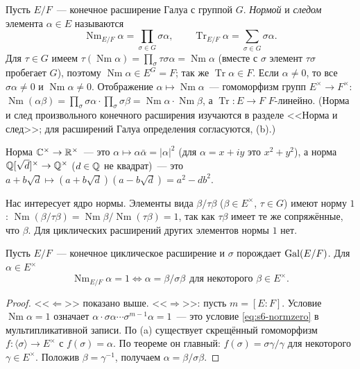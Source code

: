 Пусть $E/F$~--- конечное расширение Галуа с группой $G$. \emph{Нормой} и \emph{следом} элемента $\alpha\in E$ называются
\[
\operatorname{Nm}_{E/F}\alpha=\prod_{\sigma\in G}\sigma\alpha,\qquad \operatorname{Tr}_{E/F}\alpha=\sum_{\sigma\in G}\sigma\alpha.
\]
Для $\tau\in G$ имеем $\tau(\operatorname{Nm}\alpha)=\prod_\sigma\tau\sigma\alpha=\operatorname{Nm}\alpha$ (вместе с $\sigma$ элемент
$\tau\sigma$ пробегает $G$), поэтому $\operatorname{Nm}\alpha\in E^G=F$; так же $\operatorname{Tr}\alpha\in F$. Если $\alpha\ne0$, то все
$\sigma\alpha\ne0$ и $\operatorname{Nm}\alpha\ne0$. Отображение $\alpha\mapsto\operatorname{Nm}\alpha$~--- гомоморфизм групп $E^\times\to F^\times$:
$\operatorname{Nm}(\alpha\beta)=\prod_\sigma\sigma\alpha\cdot\prod_\sigma\sigma\beta=\operatorname{Nm}\alpha\cdot\operatorname{Nm}\beta$, а $\operatorname{Tr}\colon E\to F$
$F$-линейно. (Норма и след произвольного конечного расширения изучаются в разделе <<Норма и след>>; для расширений
Галуа определения согласуются, (b).)

\begin{example}[5.24]
Норма $\mathbb C^\times\to\mathbb R^\times$~--- это $\alpha\mapsto\alpha\bar\alpha=|\alpha|^2$ (для $\alpha=x+iy$ это $x^2+y^2$), а
норма $\mathbb Q[\sqrt d]^\times\to\mathbb Q^\times$ ($d\in\mathbb Q$ не квадрат)~--- это
$a+b\sqrt d\mapsto(a+b\sqrt d)(a-b\sqrt d)=a^2-db^2$.
\end{example}

Нас интересует ядро нормы. Элементы вида $\beta/\tau\beta$ ($\beta\in E^\times$, $\tau\in G$) имеют норму $1$:
$\operatorname{Nm}(\beta/\tau\beta)=\operatorname{Nm}\beta/\operatorname{Nm}(\tau\beta)=1$, так как $\tau\beta$ имеет те же сопряжённые, что $\beta$.
Для циклических расширений других элементов нормы $1$ нет.

\begin{corollary}
Пусть $E/F$~--- конечное циклическое расширение и $\sigma$ порождает $\operatorname{Gal}(E/F)$. Для $\alpha\in E^\times$
\[
\operatorname{Nm}_{E/F}\alpha=1\iff\alpha=\beta/\sigma\beta\ \ \text{для некоторого }\beta\in E^\times.
\]
\end{corollary}

\begin{proof}
<<$\Leftarrow$>> показано выше. <<$\Rightarrow$>>: пусть $m=[E:F]$. Условие $\operatorname{Nm}\alpha=1$ означает
$\alpha\cdot\sigma\alpha\cdots\sigma^{m-1}\alpha=1$~--- это условие \eqref{eq:s6-normzero} в мультипликативной записи. По
(a) существует скрещённый гомоморфизм $f\colon\langle\sigma\rangle\to E^\times$ с $f(\sigma)=\alpha$. По теореме
 он главный: $f(\sigma)=\sigma\gamma/\gamma$ для некоторого $\gamma\in E^\times$. Положив $\beta=\gamma^{-1}$,
получаем $\alpha=\beta/\sigma\beta$.
\end{proof}

